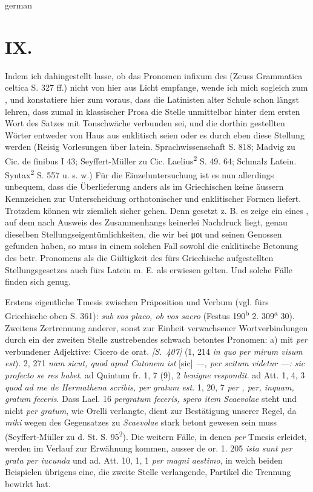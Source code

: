 \begin{otherlanguage*}{german}
\section*{IX.}

Indem ich dahingestellt lasse, ob das Pronomen infixum des  (Zeuss Grammatica celtica S. 327 ff.) nicht von hier aus Licht empfange, wende ich mich sogleich zum , und konstatiere hier zum voraus, dass die Latinisten alter Schule schon längst lehren, dass zumal in klassischer Prosa die Stelle unmittelbar hinter dem ersten Wort des Satzes mit Tonschwäche verbunden sei, und die dorthin gestellten Wörter entweder von Haus aus enklitisch seien oder es durch eben diese Stellung werden (Reisig Vorlesungen über latein. Sprachwissenschaft S. 818; Madvig zu Cic. de finibus I 43; Seyffert-Müller zu Cic. Laelius\textsuperscript{2} S. 49. 64; Schmalz Latein. Syntax\textsuperscript{2} S. 557 u. s. w.) Für die Einzeluntersuchung ist es nun allerdings unbequem, dass die Überlieferung anders als im Griechischen keine äussern Kennzeichen zur Unterscheidung orthotonischer und enklitischer Formen liefert. Trotzdem können wir ziemlich sicher gehen. Denn gesetzt z. B. es zeige ein  eines , auf dem nach Ausweis des Zusammenhangs keinerlei Nachdruck liegt, genau dieselben Stellungseigentümlichkeiten, die wir bei μοι und seinen Genossen gefunden haben, so muss in einem solchen Fall sowohl die enklitische Betonung des betr. Pronomens als die Gültigkeit des fürs Griechische aufgestellten Stellungsgesetzes auch fürs Latein m. E. als erwiesen gelten. Und solche Fälle finden sich genug.

Erstens eigentliche Tmesis zwischen Präposition und Verbum (vgl. fürs Griechische oben S. 361): \emph{sub vos placo, ob vos sacro} (Festus 190\textsuperscript{b} 2. 309\textsuperscript{a} 30). Zweitens Zertrennung anderer, sonst zur Einheit verwachsener Wortverbindungen durch ein der zweiten Stelle zustrebendes schwach betontes Pronomen: a) mit \emph{per} verbundener Adjektive: Cicero de orat. \hypertarget{p407}{\emph{[S.~407]}}\label{p407} (1, 214 \emph{in quo per  mirum visum est}). 2, 271 \emph{nam sicut, quod apud Catonem ist} [sic] \emph{—, per  scitum videtur —: sic profecto se res habet}. ad Quintum fr. 1, 7 (9), 2 \emph{ benigne respondit}. ad Att. 1, 4, 3 \emph{quod ad me de Hermathena scribis, per  gratum est}. 1, 20, 7 \emph{per , per, inquam, gratum feceris}. Dass Lael. 16 \emph{pergratum  feceris, spero item Scaevolae} steht und nicht \emph{per  gratum}, wie Orelli verlangte, dient zur Bestätigung unserer Regel, da \emph{mihi} wegen des Gegensatzes zu \emph{Scaevolae} stark betont gewesen sein muss (Seyffert-Müller zu d. St. S. 95\textsuperscript{2}). Die weitern Fälle, in denen \emph{per} Tmesis erleidet, werden im Verlauf zur Erwähnung kommen, ausser de or. 1. 205 \emph{ista sunt per grata per iucunda} und ad. Att. 10, 1, 1 \emph{per  magni aestimo}, in welch beiden Beispielen übrigens eine, die zweite Stelle verlangende, Partikel die Trennung bewirkt hat.


\end{otherlanguage*}
